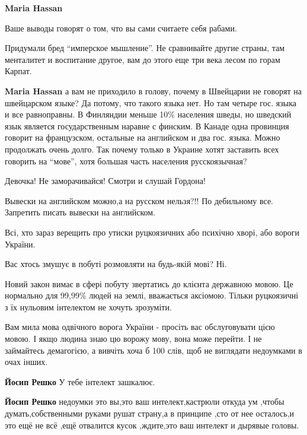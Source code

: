 \begin{itemize}
\begin{itemize}
\textbf{Maria Hassan} 

Ваше выводы говорят о том, что вы сами считаете себя рабами.

Придумали бред \enquote{имперское мышление}. Не сравнивайте другие страны, там
менталитет и воспитание другое, вам до этого еще три века лесом по горам
Карпат.


\textbf{Maria Hassan} а вам не приходило в голову, почему в Швейцарии не
говорят на швейцарском языке? Да потому, что такого языка нет. Но там четыре
гос. языка и все равноправны. В Финляндии меньше 10\% населения шведы, но
шведский язык является государственным наравне с финским. В Канаде одна
провинция говорит на французском, остальные на английском и два гос. языка.
Можно продолжать очень долго. Так почему только в Украине хотят заставить всех
говорить на \enquote{мове}, хотя большая часть населения русскоязычная?
\end{itemize}

Девочка! Не заморачивайся! Смотри и слушай Гордона!

Вывески на английском можно,а на русском нельзя?!! По дебильному все. Запретить писать вывески на английском.


Всі, хто зараз верещить про утиски руцкоязичних або психічно хворі, або вороги України.

Вас хтось змушує в побуті розмовляти на будь-якій мові?
Ні.

Новий закон вимає в сфері побуту звертатись до клієнта державною мовою. Це
нормально для 99,99\% людей на землі, вважається аксіомою. Тільки руцкоязичні з
їх нульовим інтелектом не хочуть зрозуміти.

Вам мила мова одвічного ворога України - просіть вас обслуговувати цією мовою.
І якщо людина знаю цю ворожу мову, вона може перейти.
І не займайтесь демагогією, а вивчіть хоча б 100 слів, щоб не виглядати
недоумками в очах інших.

\begin{itemize}

\textbf{Йосип Решко} У тебе інтелект зашкалює.


\textbf{Йосип Решко} недоумки это вы,это ваш интелект,кастрюли откуда ум ,чтобы
думать,собственными руками рушат страну,а в принципе ,сто от нее осталось,и это
ещё не всё ,ещё отвалится кусок ,ждите,это ваш интелект и дырявые головы.


\end{itemize}
\end{itemize}

